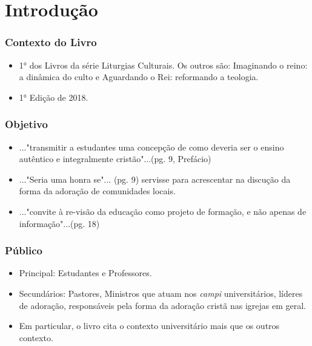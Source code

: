 \section{Introdução}

\begin{frame}
	\frametitle{Contexto do Livro}

	\begin{itemize}
		\item 1° dos Livros da série Liturgias Culturais. Os outros são: Imaginando o reino: a dinâmica do culto e Aguardando o Rei: reformando a teologia.
		\item 1° Edição de 2018.
	\end{itemize}
\end{frame}

\begin{frame}
	\frametitle{Objetivo}

	\begin{itemize}
		\item <1> ..."transmitir a estudantes uma concepção de como deveria ser o ensino autêntico e integralmente cristão"...(pg. 9, Prefácio)
		\item <2> ..."Seria uma honra se"... (pg. 9) servisse para acrescentar na discução da forma da adoração de comunidades locais.
		\item <3> ..."convite à re-visão da educação como projeto de formação, e não apenas de informação"...(pg. 18)
	\end{itemize}
\end{frame}

\begin{frame}
	\frametitle{Público}

	\begin{itemize}
		\item <1> Principal:  Estudantes e Professores.
		\item <1> Secundários: Pastores, Ministros que atuam nos \emph{campi} universitários, líderes de adoração, responsáveis pela forma da adoração cristã nas igrejas em geral.
		\item <2> Em particular, o livro cita o contexto universitário mais que os outros contexto.
	\end{itemize}
\end{frame}

